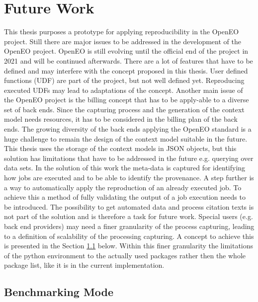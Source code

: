 \documentclass[draft,final]{vutinfth} %
\begin{document}
\section{Future Work}\label{FutureWork}
This thesis purposes a prototype for applying reproducibility in the OpenEO project. Still there are major issues to be addressed in the development of the OpenEO project. 
OpenEO is still evolving until the official end of the project in 2021 and will be continued afterwards. There are a lot of features that have to be defined and may interfere with the concept proposed in this thesis. User defined functions (UDF) are part of the project, but not well defined yet. Reproducing executed UDFs may lead to adaptations of the concept. Another main issue of the OpenEO project is the billing concept that has to be apply-able to a diverse set of back ends. Since the capturing process and the generation of the context model needs resources, it has to be considered in the billing plan of the back ends. The growing diversity of the back ends applying the OpenEO standard is a huge challenge to remain the design of the context model suitable in the future. \\
This thesis uses the storage of the context models in JSON objects, but this solution has limitations that have to be addressed in the future e.g. querying over data sets. 
In the solution of this work the meta-data is captured for identifying how jobs are executed and to be able to identify the provenance. A step further is a way to automatically apply the reproduction of an already executed job. To achieve this a method of fully validating the output of a job execution needs to be introduced. The possibility to get automated data and process citation texts is not part of the solution and is therefore a task for future work. Special users (e.g. back end providers) may need a finer granularity of the process capturing, leading to a definition of scalability of the processing capturing. A concept to achieve this is presented in the Section \ref{Job:Benchmarking} below. Within this finer granularity the limitations of the python environment to the actually used packages rather then the whole package list, like it is in the current implementation.       

\subsection{Benchmarking Mode}\label{Job:Benchmarking}
\end{document}
